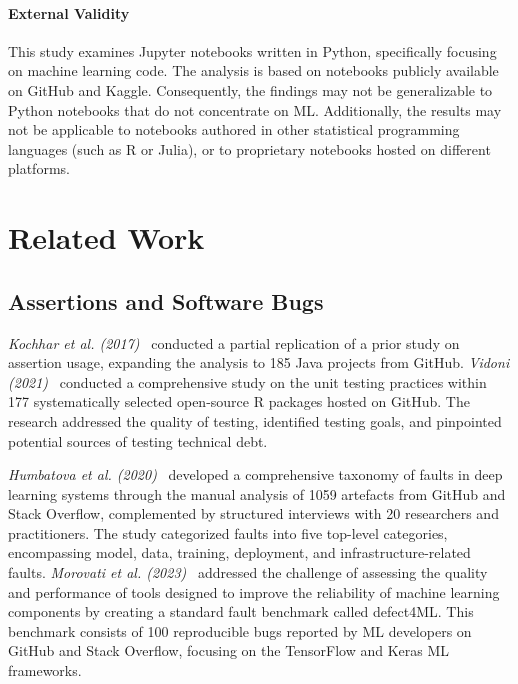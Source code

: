 \paragraph{\textbf{External Validity}} This study examines Jupyter notebooks written in Python, specifically focusing on machine learning code. The analysis is based on notebooks publicly available on GitHub and Kaggle. Consequently, the findings may not be generalizable to Python notebooks that do not concentrate on ML. Additionally, the results may not be applicable to notebooks authored in other statistical programming languages (such as R or Julia), or to proprietary notebooks hosted on different platforms.

\section{Related Work}\label{sec:related}


\subsection{Assertions and Software Bugs}

\emph{Kochhar et al. (2017)}~\cite{kochhar2017revisiting} conducted a partial replication of a prior study on assertion usage, expanding the analysis to 185 Java projects from GitHub. \emph{Vidoni (2021)}~\cite{vidoni2021evaluating} conducted a comprehensive study on the unit testing practices within 177 systematically selected open-source R packages hosted on GitHub. The research addressed the quality of testing, identified testing goals, and pinpointed potential sources of testing technical debt.

\emph{Humbatova et al. (2020)}~\cite{humbatova2020taxonomy} developed a comprehensive taxonomy of faults in deep learning systems through the manual analysis of 1059 artefacts from GitHub and Stack Overflow, complemented by structured interviews with 20 researchers and practitioners. The study categorized faults into five top-level categories, encompassing model, data, training, deployment, and infrastructure-related faults. \emph{Morovati et al. (2023)}~\cite{morovati2023bugs} addressed the challenge of assessing the quality and performance of tools designed to improve the reliability of machine learning components by creating a standard fault benchmark called defect4ML. This benchmark consists of 100 reproducible bugs reported by ML developers on GitHub and Stack Overflow, focusing on the TensorFlow and Keras ML frameworks.

